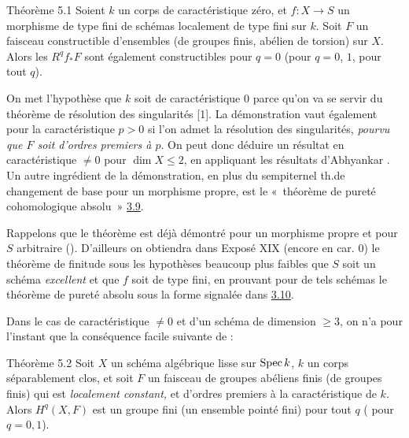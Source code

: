 \documentclass[10pt]{../fichiers-configuration-latex/smfart}
\begin{document}
\begin{enonce*}{Théorème 5.1}
Soient $k$ un corps de caractéristique zéro, et $f:X\rightarrow S$ un
morphisme de type fini de schémas localement de type fini sur
$k$. Soit $F$ un faisceau constructible d'ensembles (\resp de groupes
finis, \resp abélien de torsion) sur $X$. Alors les $R^{q}f_{\ast}F$
sont également constructibles pour $q=0$ (\resp pour $q=0$, $1$, \resp
pour tout $q$).
\end{enonce*}

On met l'hypothèse que $k$ soit de caractéristique $0$ parce qu'on va
se servir du théorème de résolution des singularités [1]. La
démonstration vaut également pour la caractéristique $p>0$ si l'on
admet la résolution des singularités, \emph{pourvu que $F$ soit
d'ordres premiers à $p$}. On peut donc déduire un résultat en
caractéristique $\neq 0$ pour $\dim X\leq 2$, en appliquant les
résultats d'Abhyankar \cite{SGA4-16:3}. Un autre ingrédient de la démonstration, en
plus du sempiternel th.\pageoriginale de changement de base pour un
morphisme propre, est le « théorème de pureté cohomologique
absolu » \hyperref[XVI.cor3.9]{3.9}.

Rappelons que le théorème est déjà démontré pour un morphisme propre
et pour $S$ arbitraire (). D'ailleurs on
obtiendra dans Exposé XIX %
(encore en car. $0$) le théorème de finitude sous les hypothèses
beaucoup plus faibles que $S$ soit un schéma \emph{excellent} et que
$f$ soit de type fini, en prouvant pour de tels schémas le théorème de
pureté absolu sous la forme signalée dans \hyperref[XVI.rems3.10]{3.10}.

Dans le cas de caractéristique $\neq 0$ et d'un schéma de dimension
$\geq 3$, on n'a pour l'instant que la conséquence facile suivante de
:

\begin{enonce*}{Théorème 5.2}
Soit $X$ un schéma algébrique lisse sur $\operatorname{Spec} k$, $k$ un corps
séparablement clos, et soit $F$ un faisceau de groupes abéliens finis
(\resp de groupes finis) qui est \emph{localement constant,} et
d'ordres premiers à la caractéristique de $k$. Alors $H^{q}(X,F)$ est
un groupe fini (\resp un ensemble pointé fini) pour tout $q$ (\resp
pour $q=0,1$).
\end{enonce*}
\end{document}
